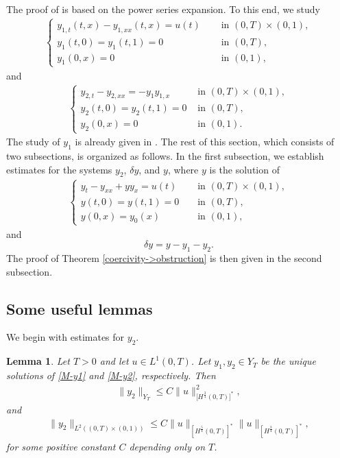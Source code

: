 \documentclass[11pt, reqno]{amsart}
\theoremstyle{plain}
\newtheorem{lemma}[thm]{Lemma}
\numberwithin{equation}{section}
\newcommand{\be}{\begin{equation}}
\newcommand{\ee}{\end{equation}}
\begin{document}
The proof of  is based on the power series expansion. To this end, we study 
 \begin{align}\label{M-y1}
\begin{cases}
  y_{1,t} (t, x) - y_{1, xx} (t, x) = u(t)  \quad &\text{ in } (0, T) \times (0, 1), \\
                y_1(t, 0) = y_1(t, 1) = 0 &\text{ in } (0, T), \\
                y_1(0, x) = 0 &\text{ in } (0, 1), 
\end{cases}
\end{align}
and 
\begin{align} \label{M-y2}
             \begin{cases}
                y_{2,t} - y_{2, xx} = -y_1 y_{1,x}  \quad &\text{ in } (0, T) \times (0, 1), \\
                y_2(t, 0) = y_2(t, 1) = 0 &\text{ in } (0, T), \\
                y_2(0, x) = 0 &\text{ in } (0, 1). 
            \end{cases}   
\end{align}  
The study of $y_1$ is already given in . The rest of this section, which consists of two subsections, is organized as follows.  In the first subsection, we establish estimates for the systems $y_2$, $\delta y$, and $y$, where  $y$ is the solution of 
   \begin{align}
        \begin{cases}   \label{M-y}
            y_t - y_{xx} + yy_x = u(t) \quad &\text{ in } (0, T) \times (0, 1), \\
            y(t, 0) = y(t, 1) = 0 &\text{ in } (0, T), \\
            y(0, x) = y_0(x) &\text{ in } (0, 1),
        \end{cases}
        \end{align}
        and 
        \be
        \mbox{$\delta y = y - y_1 - y_2$.}
        \ee
        The proof of  Theorem \ref{coercivity->obstruction} is then given in the second subsection. 


\subsection{Some useful lemmas} \label{sub-sec-1st2ndorder}

We begin with estimates for $y_2$. 

\begin{lemma} \label{lem-y2small} Let $T > 0$ and let $u \in L^1(0, T)$. Let $y_1, y_2 \in Y_T$ be the unique solutions of 
\eqref{M-y1} and \eqref{M-y2}, respectively. Then
\begin{align}
   \|y_2\|_{Y_T}  \leq C \|u\|_{[{H^{\frac{3}{4}}(0, T)]^*}}^2, \label{E-y2-2}
\end{align}
and
\begin{align}	\label{E-y2-2'}
	\|y_2\|_{L^2((0, T) \times (0, 1))} \leq C \|u\|_{[H^{\frac{5}{4}} (0, T)]^*} \|u\|_{[H^{\frac{3}{4}}(0, T)]^*}, 
\end{align}
for some positive constant $C$ depending only on $T$. 
\end{lemma}
\end{document}
